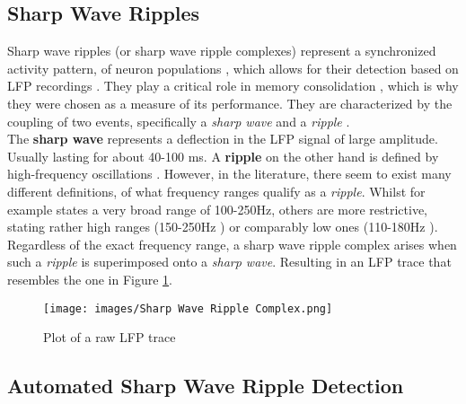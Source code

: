         
    \subsection{Sharp Wave Ripples}
    Sharp wave ripples (or sharp wave ripple complexes) represent a synchronized activity pattern, of neuron populations \cite{Buzsaki.2015}, which allows for their detection based on LFP recordings \cite{Liu.2022}. They play a critical role in memory consolidation \cite{Girardeau.2011} \cite{AmelieAussel.2020}, which is why they were chosen as a measure of its performance. They are characterized by the coupling of two events, specifically a \textit{sharp wave} and a \textit{ripple} \cite{Buzsaki.2015}.\\
    The \textbf{sharp wave} represents a deflection in the LFP signal of large amplitude. Usually lasting for about 40-100 ms. A \textbf{ripple} on the other hand is defined by high-frequency oscillations \cite{Buzsaki.2015}. However, in the literature, there seem to exist many different definitions, of what frequency ranges qualify as a \textit{ripple}. Whilst \textcite{vanQuyen.2010} for example states a very broad range of 100-250Hz, others are more restrictive, stating rather high ranges (150-250Hz \cite{Zhou.2023}) or comparably low ones (110-180Hz \cite{Liu.2022}).\\
    Regardless of the exact frequency range, a sharp wave ripple complex arises when such a \textit{ripple} is superimposed onto a \textit{sharp wave}. Resulting in an LFP trace that resembles the one in Figure \ref{fig:sharp-Wave-Ripple}.

    \begin{figure}[H]
        \centering
        \texttt{[image: images/Sharp Wave Ripple Complex.png]}
        \caption{Plot of a raw LFP trace \cite{Aussel.2018}}
        \label{fig:sharp-Wave-Ripple}
    \end{figure}


    \subsection{Automated Sharp Wave Ripple Detection}
    
